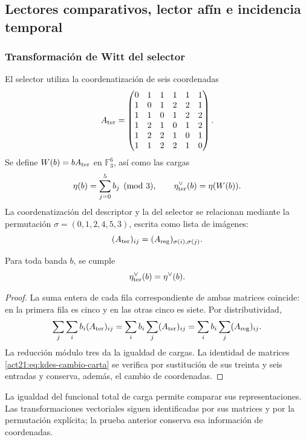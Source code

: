 \subsection{Lectores comparativos, lector afín e incidencia temporal}

\subsubsection{Transformación de Witt del selector}

El selector utiliza la coordenatización de seis coordenadas
\[
 A_{\rm ter}=
 \begin{pmatrix}
 0&1&1&1&1&1\\
 1&0&1&2&2&1\\
 1&1&0&1&2&2\\
 1&2&1&0&1&2\\
 1&2&2&1&0&1\\
 1&1&2&2&1&0
 \end{pmatrix}.
\]
Se define $W(b)=bA_{\rm ter}$ en $\mathbb F_3^6$, así como las cargas
\[
 \eta(b)=\sum_{j=0}^5 b_j\pmod3,
 \qquad\eta_{\rm ter}^\vee(b)=\eta(W(b)).
\]
La coordenatización del descriptor y la del selector se relacionan mediante la
permutación $\sigma=(0,1,2,4,5,3)$, escrita como lista de imágenes:
\begin{equation}
 (A_{\rm ter})_{ij}=(A_{\rm reg})_{\sigma(i),\sigma(j)}.
 \label{act21:eq:kdes-cambio-carta}
\end{equation}

\begin{lemma}
Para toda banda $b$, se cumple
\[
 \eta_{\rm ter}^\vee(b)=\eta^\vee(b).
\]
\end{lemma}
\begin{proof}
La suma entera de cada fila correspondiente de ambas matrices coincide:
en la primera fila es cinco y en las otras cinco es siete. Por
distributividad,
\[
 \sum_j\sum_i b_i(A_{\rm ter})_{ij}
 =\sum_i b_i\sum_j(A_{\rm ter})_{ij}
 =\sum_i b_i\sum_j(A_{\rm reg})_{ij}.
\]
La reducción módulo tres da la igualdad de cargas. La identidad de
matrices \eqref{act21:eq:kdes-cambio-carta} se verifica por sustitución de sus
treinta y seis entradas y conserva, además, el cambio de coordenadas.
\end{proof}

La igualdad del funcional total de carga permite comparar sus
representaciones. Las transformaciones vectoriales siguen identificadas
por sus matrices y por la permutación explícita; la prueba anterior
conserva esa información de coordenadas.

